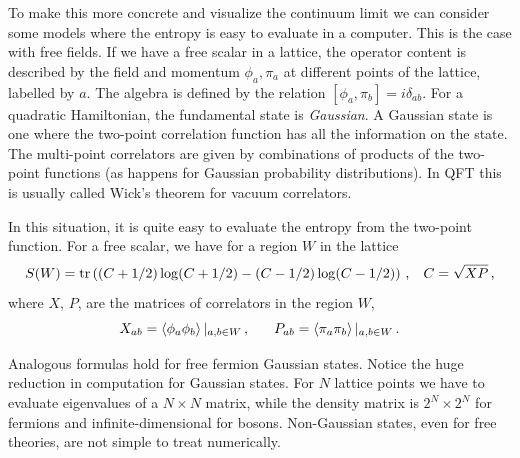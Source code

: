 \documentclass[11pt,a4paper]{article}
\numberwithin{equation}{section}
\begin{document}
To make this more concrete and visualize the continuum limit we can consider some models where the entropy is easy to evaluate in a computer. This is the case with free fields. If we have a free scalar in a lattice, the operator content is described by the field and momentum ${\phi_a,\pi_a}$ at different points of the lattice, labelled by $a$. The algebra is defined by the relation $[\phi_a,\pi_b]=i \delta_{ab}$. For a quadratic Hamiltonian, the fundamental state is {\sl Gaussian}. A Gaussian state is one where the two-point correlation function has all the information on the state. The multi-point correlators are given by combinations of products of the two-point functions (as happens for Gaussian probability distributions). In QFT this is usually called Wick's theorem for vacuum correlators.

In this situation, it is quite easy to evaluate the entropy from the two-point function. For a free scalar, we have for a region $W$ in the lattice
\begin{equation}
S(W)=\textrm{tr}\left(( C+1/2)\log (C+1/2)-(C-1/2)\log (C-1/2)\right)\,,\hspace{.3cm} C=\sqrt{X P}\,,  \label{for}
\end{equation}
where $X$, $P$, are the matrices of correlators in the region $W$,
\begin{equation}
X_{ab}=\left\langle \phi _{a}\phi _{b}\right\rangle|_{a,b \in W}  \,, \hspace{.6cm}  P_{ab}=\left\langle \pi _{a}\pi _{b}\right\rangle|_{a,b \in W}  \,. 
\end{equation}

Analogous formulas hold for free fermion Gaussian states. Notice the huge reduction in computation for Gaussian states. For $N$ lattice points we have to evaluate eigenvalues of a $N\times N$ matrix, while the density matrix is $2^N\times 2^N$ for fermions and infinite-dimensional for bosons. Non-Gaussian states, even for free theories, are not simple to treat numerically.  
\end{document}
